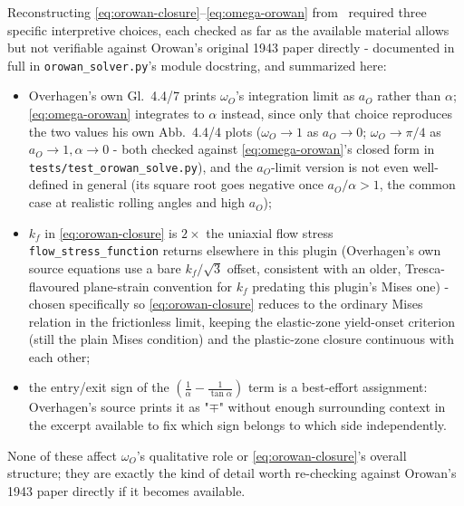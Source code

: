 \documentclass[11pt]{PyRollDocs}
\begin{document}
    Reconstructing \autoref{eq:orowan-closure}--\autoref{eq:omega-orowan} from~\cite{Overhagen2018} required three specific interpretive choices, each checked as far as the available material allows but not verifiable against Orowan's original 1943 paper directly - documented in full in \lstinline{orowan_solver.py}'s module docstring, and summarized here:
    \begin{itemize}
        \item Overhagen's own Gl.~4.4/7 prints $\omega_O$'s integration limit as $a_O$ rather than $\alpha$; \autoref{eq:omega-orowan} integrates to $\alpha$ instead, since only that choice reproduces the two values his own Abb.~4.4/4 plots ($\omega_O \to 1$ as $a_O \to 0$; $\omega_O \to \pi/4$ as $a_O \to 1, \alpha \to 0$ - both checked against \autoref{eq:omega-orowan}'s closed form in \lstinline{tests/test_orowan_solve.py}), and the $a_O$-limit version is not even well-defined in general (its square root goes negative once $a_O/\alpha > 1$, the common case at realistic rolling angles and high $a_O$);
        \item $k_f$ in \autoref{eq:orowan-closure} is $2\times$ the uniaxial flow stress \lstinline{flow_stress_function} returns elsewhere in this plugin (Overhagen's own source equations use a bare $k_f/\sqrt3$ offset, consistent with an older, Tresca-flavoured plane-strain convention for $k_f$ predating this plugin's Mises one) - chosen specifically so \autoref{eq:orowan-closure} reduces to the ordinary Mises relation in the frictionless limit, keeping the elastic-zone yield-onset criterion (still the plain Mises condition) and the plastic-zone closure continuous with each other;
        \item the entry/exit sign of the $\left(\frac1\alpha - \frac1{\tan\alpha}\right)$ term is a best-effort assignment: Overhagen's source prints it as "$\mp$" without enough surrounding context in the excerpt available to fix which sign belongs to which side independently.
    \end{itemize}
    None of these affect $\omega_O$'s qualitative role or \autoref{eq:orowan-closure}'s overall structure; they are exactly the kind of detail worth re-checking against Orowan's 1943 paper directly if it becomes available.
\end{document}
